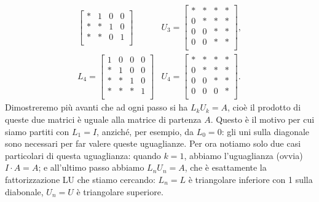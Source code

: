 \documentclass[a4paper]{report}
\theoremstyle{definiton}
\theoremstyle{remark}
\begin{document}
\[\begin{array}{ll}
\begin{bmatrix}
        * & 1 & 0 & 0\\
        * & * & 1 & 0\\        
        * & * & 0 & 1\\
    \end{bmatrix} & U_3 = \begin{bmatrix}
        * & * & * & *\\
        0 & * & * & *\\
        0 & 0 & * & *\\
        0 & 0 & * & *\\
    \end{bmatrix},\\[6ex]
    L_4 = \begin{bmatrix}
        1 & 0 & 0 & 0\\
        * & 1 & 0 & 0\\
        * & * & 1 & 0\\        
        * & * & * & 1\\
    \end{bmatrix} & U_4 = \begin{bmatrix}
        * & * & * & *\\
        0 & * & * & *\\
        0 & 0 & * & *\\
        0 & 0 & 0 & *\\
    \end{bmatrix}.
    \end{array}
\]
Dimostreremo più avanti che ad ogni passo si ha $L_k U_k = A$, cioè il prodotto di queste due matrici è uguale alla matrice di partenza $A$. Questo è il motivo per cui siamo partiti con $L_1 = I$, anziché, per esempio, da $L_0 = 0$: gli uni sulla diagonale sono necessari per far valere queste uguaglianze. Per ora notiamo solo due casi particolari di questa uguaglianza: quando $k=1$, abbiamo l'uguaglianza (ovvia) $I \cdot A = A$; e all'ultimo passo abbiamo $L_n U_n = A$, che è esattamente la fattorizzazione LU che stiamo cercando: $L_n=L$ è triangolare inferiore con 1 sulla diabonale, $U_n=U$ è triangolare superiore.
\end{document}
